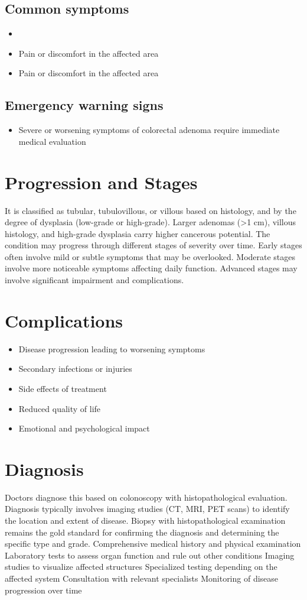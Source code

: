 \subsection{Common symptoms}
\begin{itemize}[noitemsep]
  \item \item Pain or discomfort in the affected area    \item Pain or discomfort in the affected area
  \end{itemize}

\subsection{Emergency warning signs}
\begin{itemize}[noitemsep]
  \item Severe or worsening symptoms of colorectal adenoma require immediate medical evaluation
\end{itemize}
\section{Progression and Stages}
It is classified as tubular, tubulovillous, or villous based on histology, and by the degree of dysplasia (low-grade or high-grade). Larger adenomas (>1 cm), villous histology, and high-grade dysplasia carry higher cancerous potential. The condition may progress through different stages of severity over time. Early stages often involve mild or subtle symptoms that may be overlooked. Moderate stages involve more noticeable symptoms affecting daily function. Advanced stages may involve significant impairment and complications.
\section{Complications}
\begin{itemize}[noitemsep]
  \item Disease progression leading to worsening symptoms
  \item Secondary infections or injuries
  \item Side effects of treatment
  \item Reduced quality of life
  \item Emotional and psychological impact
\end{itemize}
\section{Diagnosis}
Doctors diagnose this based on colonoscopy with histopathological evaluation. Diagnosis typically involves imaging studies (CT, MRI, PET scans) to identify the location and extent of disease. Biopsy with histopathological examination remains the gold standard for confirming the diagnosis and determining the specific type and grade. Comprehensive medical history and physical examination Laboratory tests to assess organ function and rule out other conditions Imaging studies to visualize affected structures Specialized testing depending on the affected system Consultation with relevant specialists Monitoring of disease progression over time

